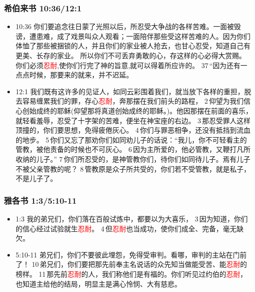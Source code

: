 \subsubsection{希伯来书 10:36/12:1} 
\begin{itemize}[noitemsep]
\item 10:36 你们要追念往日蒙了光照以后，所忍受大争战的各样苦难。一面被毁谤，遭患难，成了戏景叫众人观看；一面陪伴那些受这样苦难的人。因为你们体恤了那些被捆锁的人，并且你们的家业被人抢去，也甘心忍受，知道自己有更美、长存的家业。 所以你们不可丢弃勇敢的心，存这样的心必得大赏赐。你们必须\textcolor{red}{忍耐},使你们行完了神的旨意,就可以得着所应许的。 37 “因为还有一点点时候，那要来的就来，并不迟延。

\item 12:1 我们既有这许多的见证人，如同云彩围着我们，就当放下各样的重担，脱去容易缠累我们的罪，存心\textcolor{red}{忍耐}，奔那摆在我们前头的路程， 2 仰望为我们信心创始成终的耶稣(仰望那将真道创始成终的耶稣。)。他因那摆在前面的喜乐，就轻看羞辱，忍受了十字架的苦难，便坐在神宝座的右边。 3 那忍受罪人这样顶撞的，你们要思想，免得疲倦灰心。 4 你们与罪恶相争，还没有抵挡到流血的地步。 5 你们又忘了那劝你们如同劝儿子的话说：“我儿，你不可轻看主的管教，被他责备的时候也不可灰心。 6 因为主所爱的，他必管教，又鞭打凡所收纳的儿子。” 7 你们所忍受的，是神管教你们，待你们如同待儿子。焉有儿子不被父亲管教的呢？ 8 管教原是众子所共受的，你们若不受管教，就是私子，不是儿子了。
\end{itemize}
\subsubsection{雅各书 1:3/5:10-11} 
\begin{itemize}[noitemsep]
\item 1:3 我的弟兄们，你们落在百般试炼中，都要以为大喜乐， 3 因为知道，你们的信心经过试验就生\textcolor{red}{忍耐}。 4 但\textcolor{red}{忍耐}也当成功，使你们成全、完备，毫无缺欠。

\item 5:10-11 弟兄们，你们不要彼此埋怨，免得受审判。看哪，审判的主站在门前了！ 10 弟兄们，你们要把那先前奉主名说话的众先知当做能受苦、能\textcolor{red}{忍耐}的榜样。 11 那先前\textcolor{red}{忍耐}的人，我们称他们是有福的。你们听见过约伯的\textcolor{red}{忍耐}，也知道主给他的结局，明显主是满心怜悯、大有慈悲。
\end{itemize}
